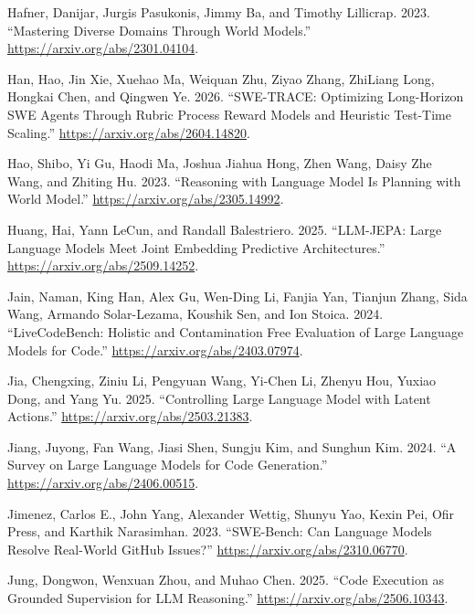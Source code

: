 \documentclass{article}
\newlength{\cslhangindent}
\newenvironment{CSLReferences}[2]
 {%
  \setlength{\parindent}{0pt}
  \everypar{\setlength{\hangindent}{\cslhangindent}}\ignorespaces
 }
 {\par}
\begin{document}
\begin{CSLReferences}{1}{0}
\leavevmode{}%
Hafner, Danijar, Jurgis Pasukonis, Jimmy Ba, and Timothy Lillicrap.
2023. {``Mastering Diverse Domains Through World Models.''}
\url{https://arxiv.org/abs/2301.04104}.

\leavevmode{}%
Han, Hao, Jin Xie, Xuehao Ma, Weiquan Zhu, Ziyao Zhang, ZhiLiang Long,
Hongkai Chen, and Qingwen Ye. 2026. {``SWE-TRACE: Optimizing
Long-Horizon SWE Agents Through Rubric Process Reward Models and
Heuristic Test-Time Scaling.''} \url{https://arxiv.org/abs/2604.14820}.

\leavevmode{}%
Hao, Shibo, Yi Gu, Haodi Ma, Joshua Jiahua Hong, Zhen Wang, Daisy Zhe
Wang, and Zhiting Hu. 2023. {``Reasoning with Language Model Is Planning
with World Model.''} \url{https://arxiv.org/abs/2305.14992}.

\leavevmode{}%
Huang, Hai, Yann LeCun, and Randall Balestriero. 2025. {``LLM-JEPA:
Large Language Models Meet Joint Embedding Predictive Architectures.''}
\url{https://arxiv.org/abs/2509.14252}.

\leavevmode{}%
Jain, Naman, King Han, Alex Gu, Wen-Ding Li, Fanjia Yan, Tianjun Zhang,
Sida Wang, Armando Solar-Lezama, Koushik Sen, and Ion Stoica. 2024.
{``LiveCodeBench: Holistic and Contamination Free Evaluation of Large
Language Models for Code.''} \url{https://arxiv.org/abs/2403.07974}.

\leavevmode{}%
Jia, Chengxing, Ziniu Li, Pengyuan Wang, Yi-Chen Li, Zhenyu Hou, Yuxiao
Dong, and Yang Yu. 2025. {``Controlling Large Language Model with Latent
Actions.''} \url{https://arxiv.org/abs/2503.21383}.

\leavevmode{}%
Jiang, Juyong, Fan Wang, Jiasi Shen, Sungju Kim, and Sunghun Kim. 2024.
{``A Survey on Large Language Models for Code Generation.''}
\url{https://arxiv.org/abs/2406.00515}.

\leavevmode{}%
Jimenez, Carlos E., John Yang, Alexander Wettig, Shunyu Yao, Kexin Pei,
Ofir Press, and Karthik Narasimhan. 2023. {``SWE-Bench: Can Language
Models Resolve Real-World GitHub Issues?''}
\url{https://arxiv.org/abs/2310.06770}.

\leavevmode{}%
Jung, Dongwon, Wenxuan Zhou, and Muhao Chen. 2025. {``Code Execution as
Grounded Supervision for LLM Reasoning.''}
\url{https://arxiv.org/abs/2506.10343}.


\end{CSLReferences}
\end{document}
